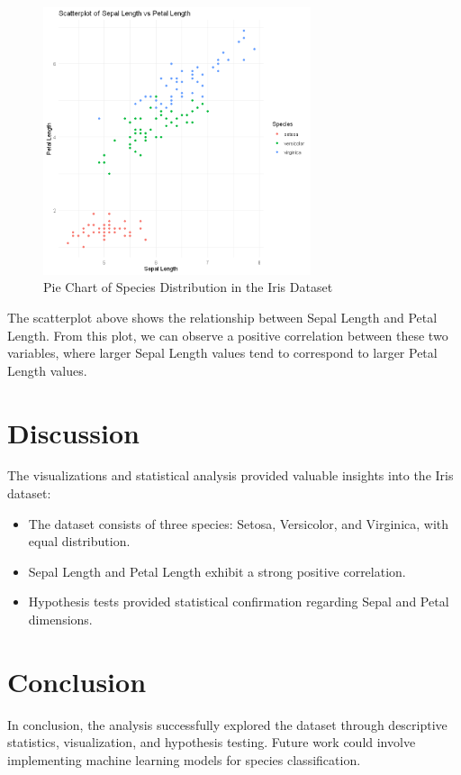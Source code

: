 \documentclass[a4paper,12pt]{article}
\begin{document}
    \begin{figure}[h]
        \includegraphics[width=0.7\textwidth]{05.png}
        \caption{Pie Chart of Species Distribution in the Iris Dataset}
        \label{fig:pie_chart}
    \end{figure}
    The scatterplot above shows the relationship between Sepal Length and Petal Length. From this plot, we can observe a positive correlation between these two variables, where larger Sepal Length values tend to correspond to larger Petal Length values.

    \newpage

\section{Discussion}
The visualizations and statistical analysis provided valuable insights into the Iris dataset:
\begin{itemize}
    \item The dataset consists of three species: Setosa, Versicolor, and Virginica, with equal distribution.
    \item Sepal Length and Petal Length exhibit a strong positive correlation.
    \item Hypothesis tests provided statistical confirmation regarding Sepal and Petal dimensions.
\end{itemize}

\section{Conclusion}
In conclusion, the analysis successfully explored the dataset through descriptive statistics, visualization, and hypothesis testing. Future work could involve implementing machine learning models for species classification.
\end{document}
